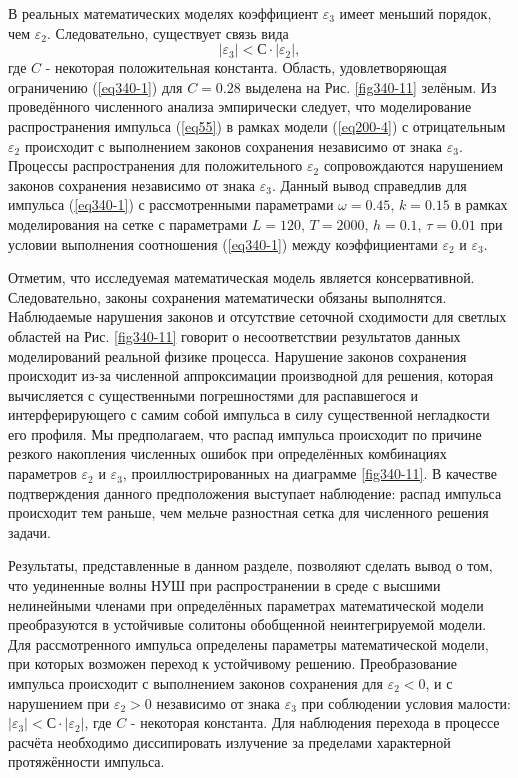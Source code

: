 \documentclass[14pt,a4paper]{extreport}
\begin{document}
			В реальных математических моделях коэффициент \(\varepsilon_{3}\) имеет меньший порядок, чем \(\varepsilon_{2}\). Следовательно, существует связь вида
			\begin{equation}\label{eq340-1}
				|\varepsilon_{3}| < С \cdot |\varepsilon_{2}|,
			\end{equation}
			где \(C\) - некоторая положительная константа. Область, удовлетворяющая ограничению (\ref{eq340-1}) для \(C=0.28\) выделена на Рис. \ref{fig340-11} зелёным. Из проведённого численного анализа эмпирически следует, что моделирование распространения импульса (\ref{eq55}) в рамках модели (\ref{eq200-4}) с отрицательным \(\varepsilon_{2}\) происходит с выполнением законов сохранения независимо от знака \(\varepsilon_{3}\). Процессы распространения для положительного \(\varepsilon_{2}\) сопровождаются нарушением законов сохранения независимо от знака \(\varepsilon_{3}\). Данный вывод справедлив для импульса (\ref{eq340-1}) с рассмотренными параметрами \(\omega=0.45,\, k=0.15\) в рамках моделирования на сетке с параметрами \(L=120,\, T=2000,\, h=0.1,\, \tau=0.01\) при условии выполнения соотношения (\ref{eq340-1}) между коэффициентами \(\varepsilon_{2}\) и \(\varepsilon_{3}\).

			Отметим, что исследуемая математическая модель является консервативной. Следовательно, законы сохранения математически обязаны выполнятся. Наблюдаемые нарушения законов и отсутствие сеточной сходимости для светлых областей на Рис. \ref{fig340-11} говорит о несоответствии результатов данных моделирований реальной физике процесса. Нарушение законов сохранения происходит из-за численной аппроксимации производной для решения, которая вычисляется с существенными погрешностями для распавшегося и интерферирующего с самим собой импульса в силу существенной негладкости его профиля. Мы предполагаем, что распад импульса происходит по причине резкого накопления численных ошибок при определённых комбинациях параметров \(\varepsilon_{2}\) и \(\varepsilon_{3}\), проиллюстрированных на диаграмме \ref{fig340-11}. В качестве подтверждения данного предположения выступает наблюдение: распад импульса происходит тем раньше, чем мельче разностная сетка для численного решения задачи.

			Результаты, представленные в данном разделе, позволяют сделать вывод о том, что уединенные волны НУШ при распространении в среде с высшими нелинейными членами при определённых параметрах математической модели преобразуются в устойчивые солитоны обобщенной неинтегрируемой модели. Для рассмотренного импульса определены параметры математической модели, при которых возможен переход к устойчивому решению.
			Преобразование импульса происходит с выполнением законов сохранения для \(\varepsilon_{2}<0\), и с нарушением при \(\varepsilon_{2}>0\) независимо от знака \(\varepsilon_{3}\) при соблюдении условия малости: \(|\varepsilon_{3}| < С \cdot |\varepsilon_{2}|\), где \(C\) - некоторая константа. Для наблюдения перехода в процессе расчёта необходимо диссипировать излучение за пределами характерной протяжённости импульса.
\end{document}

